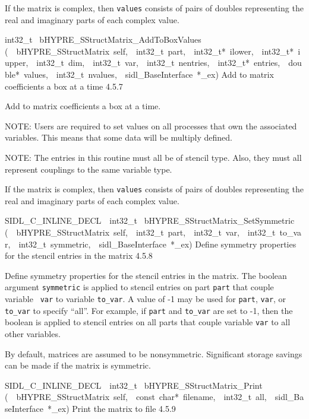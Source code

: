 \documentclass{article}
\begin{document}
\begin{cxxentry}
\begin{cxxentry}
\begin{cxxfunction}
\begin{cxxdoc}
If the matrix is complex, then {\tt values} consists of pairs
of doubles representing the real and imaginary parts of each
complex value.
\end{cxxdoc}
\end{cxxfunction}
\begin{cxxfunction}
{int32\_t\ }
        {bHYPRE\_SStructMatrix\_AddToBoxValues}
        {(\ \ bHYPRE\_SStructMatrix\ self,\ \ int32\_t\ part,\ \ int32\_t*\ ilower,\ \ int32\_t*\ iupper,\ \ int32\_t\ dim,\ \ int32\_t\ var,\ \ int32\_t\ nentries,\ \ int32\_t*\ entries,\ \ double*\ values,\ \ int32\_t\ nvalues,\ \ sidl\_BaseInterface\ *\_ex)}
        {
Add to matrix coefficients a box at a time}
        {4.5.7}
\begin{cxxdoc}

Add to matrix coefficients a box at a time.

NOTE: Users are required to set values on all processes that
own the associated variables.  This means that some data will
be multiply defined.

NOTE: The entries in this routine must all be of stencil
type.  Also, they must all represent couplings to the same
variable type.

If the matrix is complex, then {\tt values} consists of pairs
of doubles representing the real and imaginary parts of each
complex value.
\end{cxxdoc}
\end{cxxfunction}
\begin{cxxfunction}
{SIDL\_C\_INLINE\_DECL\ \ int32\_t\ }
        {bHYPRE\_SStructMatrix\_SetSymmetric}
        {(\ \ bHYPRE\_SStructMatrix\ self,\ \ int32\_t\ part,\ \ int32\_t\ var,\ \ int32\_t\ to\_var,\ \ int32\_t\ symmetric,\ \ sidl\_BaseInterface\ *\_ex)}
        {
Define symmetry properties for the stencil entries in the
matrix}
        {4.5.8}
\begin{cxxdoc}

Define symmetry properties for the stencil entries in the
matrix.  The boolean argument {\tt symmetric} is applied to
stencil entries on part {\tt part} that couple variable {\tt
var} to variable {\tt to\_var}.  A value of -1 may be used
for {\tt part}, {\tt var}, or {\tt to\_var} to specify
``all''.  For example, if {\tt part} and {\tt to\_var} are
set to -1, then the boolean is applied to stencil entries on
all parts that couple variable {\tt var} to all other
variables.

By default, matrices are assumed to be nonsymmetric.
Significant storage savings can be made if the matrix is
symmetric.
\end{cxxdoc}
\end{cxxfunction}
\begin{cxxfunction}
{SIDL\_C\_INLINE\_DECL\ \ int32\_t\ }
        {bHYPRE\_SStructMatrix\_Print}
        {(\ \ bHYPRE\_SStructMatrix\ self,\ \ const\ char*\ filename,\ \ int32\_t\ all,\ \ sidl\_BaseInterface\ *\_ex)}
        {
Print the matrix to file}
        {4.5.9}
\begin{cxxdoc}


\end{cxxdoc}
\end{cxxfunction}
\end{cxxentry}
\end{cxxentry}
\end{document}
